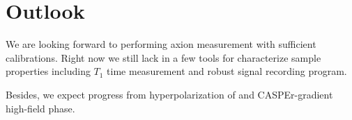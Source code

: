 \section{Outlook}

We are looking forward to performing axion measurement with sufficient calibrations. Right now we still lack in a few tools for characterize sample properties including $T_1$ time measurement and robust signal recording program. 

Besides, we expect progress from hyperpolarization of  and CASPEr-gradient high-field phase. 